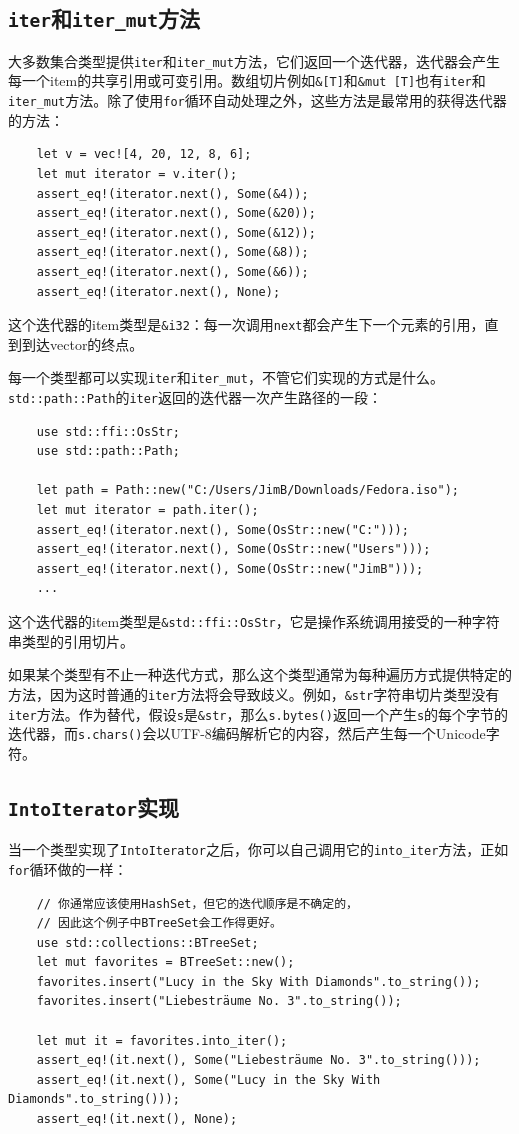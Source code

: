\subsection{\texttt{iter}和\texttt{iter\_mut}方法}
大多数集合类型提供\texttt{iter}和\texttt{iter\_mut}方法，它们返回一个迭代器，迭代器会产生每一个item的共享引用或可变引用。数组切片例如\texttt{\&[T]}和\texttt{\&mut [T]}也有\texttt{iter}和\texttt{iter\_mut}方法。除了使用\texttt{for}循环自动处理之外，这些方法是最常用的获得迭代器的方法：
\begin{verbatim}
    let v = vec![4, 20, 12, 8, 6];
    let mut iterator = v.iter();
    assert_eq!(iterator.next(), Some(&4));
    assert_eq!(iterator.next(), Some(&20));
    assert_eq!(iterator.next(), Some(&12));
    assert_eq!(iterator.next(), Some(&8));
    assert_eq!(iterator.next(), Some(&6));
    assert_eq!(iterator.next(), None);
\end{verbatim}

这个迭代器的item类型是\texttt{\&i32}：每一次调用\texttt{next}都会产生下一个元素的引用，直到到达vector的终点。

每一个类型都可以实现\texttt{iter}和\texttt{iter\_mut}，不管它们实现的方式是什么。\texttt{std::path::Path}的\texttt{iter}返回的迭代器一次产生路径的一段：
\begin{verbatim}
    use std::ffi::OsStr;
    use std::path::Path;

    let path = Path::new("C:/Users/JimB/Downloads/Fedora.iso");
    let mut iterator = path.iter();
    assert_eq!(iterator.next(), Some(OsStr::new("C:")));
    assert_eq!(iterator.next(), Some(OsStr::new("Users")));
    assert_eq!(iterator.next(), Some(OsStr::new("JimB")));
    ...
\end{verbatim}

这个迭代器的item类型是\texttt{\&std::ffi::OsStr}，它是操作系统调用接受的一种字符串类型的引用切片。

如果某个类型有不止一种迭代方式，那么这个类型通常为每种遍历方式提供特定的方法，因为这时普通的\texttt{iter}方法将会导致歧义。例如，\texttt{\&str}字符串切片类型没有\texttt{iter}方法。作为替代，假设\texttt{s}是\texttt{\&str}，那么\texttt{s.bytes()}返回一个产生\texttt{s}的每个字节的迭代器，而\texttt{s.chars()}会以UTF-8编码解析它的内容，然后产生每一个Unicode字符。

\subsection{\texttt{IntoIterator}实现}
当一个类型实现了\texttt{IntoIterator}之后，你可以自己调用它的\texttt{into\_iter}方法，正如\texttt{for}循环做的一样：
\begin{verbatim}
    // 你通常应该使用HashSet，但它的迭代顺序是不确定的，
    // 因此这个例子中BTreeSet会工作得更好。
    use std::collections::BTreeSet;
    let mut favorites = BTreeSet::new();
    favorites.insert("Lucy in the Sky With Diamonds".to_string());
    favorites.insert("Liebesträume No. 3".to_string());

    let mut it = favorites.into_iter();
    assert_eq!(it.next(), Some("Liebesträume No. 3".to_string()));
    assert_eq!(it.next(), Some("Lucy in the Sky With Diamonds".to_string()));
    assert_eq!(it.next(), None);
\end{verbatim}


